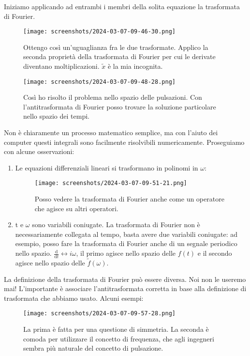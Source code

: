 Iniziamo applicando ad entrambi i membri della solita equazione la trasformata di Fourier.
\begin{figure}[H]
	\centering
	\texttt{[image: screenshots/2024-03-07-09-46-30.png]}
	\caption{Ottengo così un'uguaglianza fra le due trasformate. Applico la seconda proprietà della trasformata di Fourier per cui le derivate diventano moltiplicazioni. \(\widetilde{x} \) è la mia incognita. }
\end{figure}
\begin{figure}[H]
	\centering
	\texttt{[image: screenshots/2024-03-07-09-48-28.png]}
	\caption{Così ho risolto il problema nello spazio delle pulsazioni. Con l'antitrasformata di Fourier posso trovare la soluzione particolare nello spazio dei tempi.}
\end{figure}
Non è chiaramente un processo matematico semplice, ma con l'aiuto dei computer questi integrali sono facilmente risolvibili numericamente. Proseguiamo con alcune osservazioni:
\begin{enumerate}
	\item Le equazioni differenziali lineari si trasformano in polinomi in \(\omega \):
	\begin{figure}[H]
		\centering
		\texttt{[image: screenshots/2024-03-07-09-51-21.png]}
		\caption{Posso vedere la trasformata di Fourier anche come un operatore che agisce su altri operatori.}
	\end{figure}
	
	\item t e \(\omega \) sono variabili coniugate. La trasformata di Fourier non è necessariamente collegata al tempo, basta avere due variabili coniugate: ad esempio, posso fare la trasformata di Fourier anche di un segnale periodico nello spazio. \(\frac{\mathrm{d}}{\mathrm{d}t} \leftrightarrow i \omega   \), il primo agisce nello spazio delle \(f(t)\) e il secondo agisce nello spazio delle \(\widetilde{f}(\omega ) \).  
\end{enumerate}

\begin{note}
	La definizione della trasformata di Fourier può essere diversa. Noi non le useremo mai! L'importante è associare l'antitrasformata corretta in base alla definizione di trasformata che abbiamo usato. Alcuni esempi:
	\begin{figure}[H]
		\centering
		\texttt{[image: screenshots/2024-03-07-09-57-28.png]}
		\caption{La prima è fatta per una questione di simmetria. La seconda è comoda per utilizzare il concetto di frequenza, che agli ingegneri sembra più naturale del concetto di pulsazione.}
	\end{figure}
\end{note}

